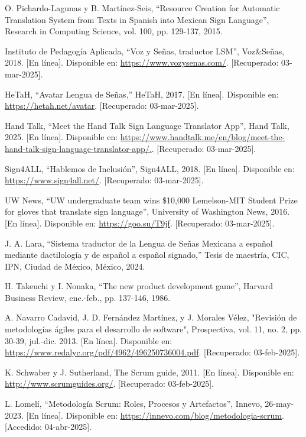 \begin{thebibliography}{200}
    O. Pichardo-Lagunas y B. Martínez-Seis, “Resource Creation for Automatic Translation System from Texts in Spanish into Mexican Sign Language”, Research in Computing Science, vol. 100, pp. 129-137, 2015.

    Instituto de Pedagogía Aplicada, “Voz y Señas, traductor LSM”, Voz\&Señas, 2018. [En línea]. Disponible en: \url{https://www.vozysenas.com/}. [Recuperado: 03-mar-2025].

    HeTaH, “Avatar Lengua de Señas,” HeTaH, 2017. [En línea]. Disponible en: \url{https://hetah.net/avatar}. [Recuperado: 03-mar-2025].

    Hand Talk, “Meet the Hand Talk Sign Language Translator App”, Hand Talk, 2025. [En línea]. Disponible en: \url{https://www.handtalk.me/en/blog/meet-the-hand-talk-sign-language-translator-app/.}. [Recuperado: 03-mar-2025].

    Sign4ALL, “Hablemos de Inclusión”, Sign4ALL, 2018. [En línea]. Disponible en: \url{https://www.sign4all.net/}. [Recuperado: 03-mar-2025].

    UW News, “UW undergraduate team wins \$10,000 Lemelson-MIT Student Prize for gloves that translate sign language”, University of Washington News, 2016. [En línea]. Disponible en: \url{https://goo.su/T9jf}. [Recuperado: 03-mar-2025].

    J. A. Lara, “Sistema traductor de la Lengua de Señas Mexicana a español mediante dactilología y de español a español signado,” Tesis de maestría, CIC, IPN, Ciudad de México, México, 2024.

    H. Takeuchi y I. Nonaka, “The new product development game”, Harvard Business Review, ene.-feb., pp. 137-146, 1986.

    A. Navarro Cadavid, J. D. Fernández Martínez, y J. Morales Vélez, "Revisión de metodologías ágiles para el desarrollo de software", Prospectiva, vol. 11, no. 2, pp. 30-39, jul.-dic. 2013. [En línea]. Disponible en: \url{https://www.redalyc.org/pdf/4962/496250736004.pdf}. [Recuperado: 03-feb-2025].

    K. Schwaber y J. Sutherland, The Scrum guide, 2011. [En línea]. Disponible en: \url{http://www.scrumguides.org/}. [Recuperado: 03-feb-2025].

    L. Lomelí, “Metodología Scrum: Roles, Procesos y Artefactos”, Innevo, 26-may-2023. [En línea]. Disponible en: \url{https://innevo.com/blog/metodologia-scrum}. [Accedido: 04-abr-2025].


\end{thebibliography}
